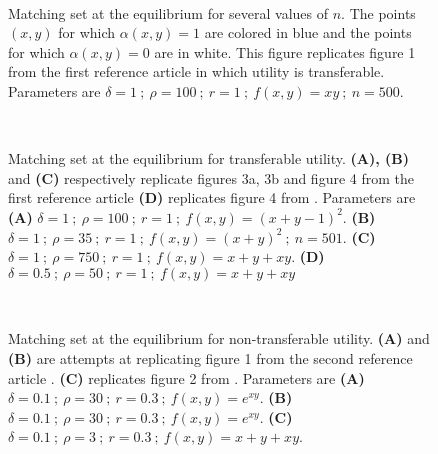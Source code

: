 \begin{figure}[!ht]
   \centering
   \quad
   \quad
   \\
   \caption{Matching set at the equilibrium for several values of $n$. The points $(x,y)$ for which $\alpha(x,y)=1$ are colored in blue and the points for which $\alpha(x,y)=0$ are in white. This figure replicates figure 1 from the first reference article \citep{shimer_assortative_2000} in which utility is transferable. Parameters are $\delta=1 \ ; \ \rho=100 \ ; \ r=1 \ ; \ f(x,y)=xy \ ; \ n=500$.}
   \label{fig:fig1}
\end{figure}

 

\begin{figure}[!ht]
   \centering
   \quad
   \\
   \quad
   \caption{Matching set at the equilibrium for transferable utility. \textbf{(A), (B)} and \textbf{(C)} respectively replicate figures 3a, 3b and figure 4 from the first reference article \citep{shimer_assortative_2000} \textbf{(D)} replicates figure 4 from \citep{smith_frictional_2011}. Parameters are \textbf{(A)} $\delta=1 \ ; \ \rho=100 \ ; \ r=1 \ ; \ f(x,y)=(x+y-1)^2$. \textbf{(B)} $\delta=1 \ ; \ \rho=35 \ ; \ r=1 \ ; \ f(x,y)=(x+y)^2 \ ; \ n=501$. \textbf{(C)} $\delta=1 \ ; \ \rho=750 \ ; \ r=1 \ ; \ f(x,y)=x+y+xy$. \textbf{(D)} $\delta=0.5 \ ; \ \rho=50 \ ; \ r=1 \ ; \ f(x,y)=x+y+xy$}
   \label{fig:fig2}
\end{figure}





\begin{figure}[!ht]
   \centering
   \quad
   \\
   \caption{Matching set at the equilibrium for non-transferable utility. \textbf{(A)} and \textbf{(B)} are attempts at replicating figure 1 from the second reference article \citep{smith_marriage_2006}. \textbf{(C)} replicates figure 2 from \citep{smith_marriage_2006}. Parameters are \textbf{(A)} $\delta=0.1 \ ; \ \rho=30 \ ; \ r=0.3 \ ; \ f(x,y)=e^{xy}$. \textbf{(B)} $\delta=0.1 \ ; \ \rho=30 \ ; \ r=0.3 \ ; \ f(x,y)=e^{xy}$. \textbf{(C)} $\delta=0.1 \ ; \ \rho=3 \ ; \ r=0.3 \ ; \ f(x,y)=x+y+xy$.}
   \label{fig:fig3}
\end{figure}
 




